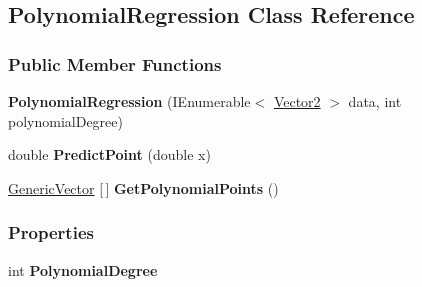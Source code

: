 \hypertarget{classDataTools_1_1regression_1_1PolynomialRegression}{}\subsection{Polynomial\+Regression Class Reference}
\label{classDataTools_1_1regression_1_1PolynomialRegression}
\subsubsection*{Public Member Functions}
\begin{DoxyCompactItemize}
\item 
\mbox{\label{classDataTools_1_1regression_1_1PolynomialRegression_aa3fbc58ba143383d0871ad14f8002cfb}} 
{\bfseries Polynomial\+Regression} (I\+Enumerable$<$ \hyperlink{classDataTools_1_1Vector2}{Vector2} $>$ data, int polynomial\+Degree)
\item 
\mbox{\label{classDataTools_1_1regression_1_1PolynomialRegression_ac5389e13f7d514bdb1f86084410a7403}} 
double {\bfseries Predict\+Point} (double x)
\item 
\mbox{\label{classDataTools_1_1regression_1_1PolynomialRegression_a5d4cd56b06140a849034cbc8622893ac}} 
\hyperlink{classDataTools_1_1GenericVector}{Generic\+Vector} \mbox{[}$\,$\mbox{]} {\bfseries Get\+Polynomial\+Points} ()
\end{DoxyCompactItemize}
\subsubsection*{Properties}
\begin{DoxyCompactItemize}
\item 
\mbox{\label{classDataTools_1_1regression_1_1PolynomialRegression_a2df2ef6ee61910923ddd75fdc235ee95}} 
int {\bfseries Polynomial\+Degree}
\end{DoxyCompactItemize}
